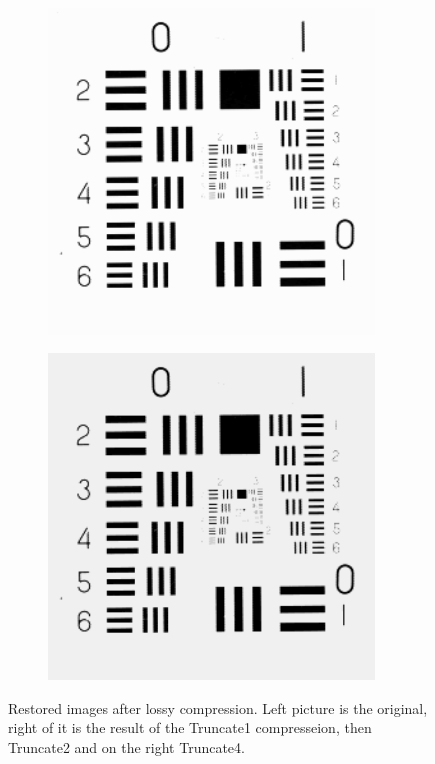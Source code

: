 \begin{figure}
\begin{subfigure}[b]{.23\textwidth}
  \caption{}
  \label{fig:test-images-resolutionchart}
\end{subfigure}
\begin{subfigure}[b]{.23\textwidth}
  \centering
  \includegraphics[width=0.95\textwidth]{figures/test-images/truncate2/resolutionchart}
  \caption{}
  \label{fig:test-images-resolutionchart}
\end{subfigure}
\begin{subfigure}[b]{.23\textwidth}
  \centering
  \includegraphics[width=0.95\textwidth]{figures/test-images/truncate4/resolutionchart}
  \caption{}
  \label{fig:test-images-resolutionchart}
\end{subfigure}

\caption{Restored images after lossy compression. Left picture is the original, right of it is the result of the Truncate1 compresseion, then Truncate2 and on the right Truncate4.}
\label{fig:test-images}
\end{figure}
